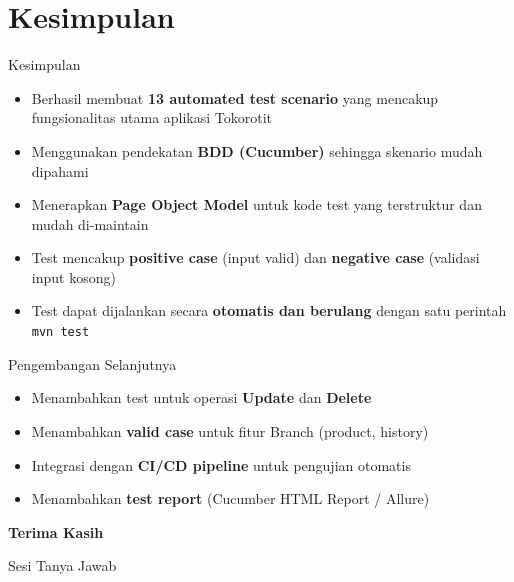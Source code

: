 \documentclass[aspectratio=169]{beamer}
\begin{document}
\section{Kesimpulan}

\begin{frame}{Kesimpulan}
  \begin{itemize}
    \item Berhasil membuat \textbf{13 automated test scenario} yang mencakup fungsionalitas utama aplikasi Tokorotit
    \item Menggunakan pendekatan \textbf{BDD (Cucumber)} sehingga skenario mudah dipahami
    \item Menerapkan \textbf{Page Object Model} untuk kode test yang terstruktur dan mudah di-maintain
    \item Test mencakup \textbf{positive case} (input valid) dan \textbf{negative case} (validasi input kosong)
    \item Test dapat dijalankan secara \textbf{otomatis dan berulang} dengan satu perintah \texttt{mvn test}
  \end{itemize}

  \vspace{1em}
  \begin{block}{Pengembangan Selanjutnya}
    \begin{itemize}
      \item Menambahkan test untuk operasi \textbf{Update} dan \textbf{Delete}
      \item Menambahkan \textbf{valid case} untuk fitur Branch (product, history)
      \item Integrasi dengan \textbf{CI/CD pipeline} untuk pengujian otomatis
      \item Menambahkan \textbf{test report} (Cucumber HTML Report / Allure)
    \end{itemize}
  \end{block}
\end{frame}

\begin{frame}
  \centering
  \Huge\bfseries Terima Kasih

  \vspace{1em}
  \Large Sesi Tanya Jawab
\end{frame}
\end{document}
